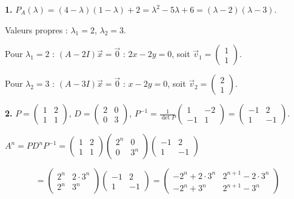 \documentclass[12pt,a4paper]{article}
\begin{document}
\begin{boitecorrige}
\textbf{1.} $P_A(\lambda) = (4-\lambda)(1-\lambda)+2 = \lambda^2-5\lambda+6 = (\lambda-2)(\lambda-3)$.

Valeurs propres : $\lambda_1 = 2$, $\lambda_2 = 3$.

Pour $\lambda_1 = 2$ : $(A-2I)\vec{x}=\vec{0}$ : $2x-2y=0$, soit $\vec{v}_1 = \begin{pmatrix}1\\1\end{pmatrix}$.

Pour $\lambda_2 = 3$ : $(A-3I)\vec{x}=\vec{0}$ : $x-2y=0$, soit $\vec{v}_2 = \begin{pmatrix}2\\1\end{pmatrix}$.

\textbf{2.} $P = \begin{pmatrix}1&2\\1&1\end{pmatrix}$, $D = \begin{pmatrix}2&0\\0&3\end{pmatrix}$, $P^{-1} = \frac{1}{\det P}\begin{pmatrix}1&-2\\-1&1\end{pmatrix} = \begin{pmatrix}-1&2\\1&-1\end{pmatrix}$.

$A^n = PD^nP^{-1} = \begin{pmatrix}1&2\\1&1\end{pmatrix}\begin{pmatrix}2^n&0\\0&3^n\end{pmatrix}\begin{pmatrix}-1&2\\1&-1\end{pmatrix}$

\[
= \begin{pmatrix}2^n&2\cdot3^n\\2^n&3^n\end{pmatrix}\begin{pmatrix}-1&2\\1&-1\end{pmatrix}
= \begin{pmatrix}-2^n+2\cdot3^n & 2^{n+1}-2\cdot3^n \\ -2^n+3^n & 2^{n+1}-3^n\end{pmatrix}
\]


\end{boitecorrige}
\end{document}
